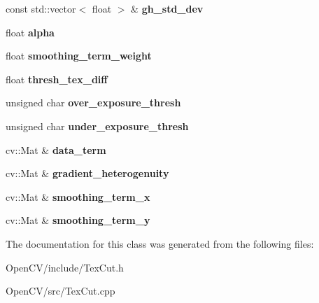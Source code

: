 \begin{DoxyCompactItemize}
\hypertarget{classskl_1_1_parallel_calc_edge_capacity_a0e4d4be48637b8329afced2078b24081}{}\label{classskl_1_1_parallel_calc_edge_capacity_a0e4d4be48637b8329afced2078b24081} 
const std\+::vector$<$ float $>$ \& {\bfseries gh\+\_\+std\+\_\+dev}
\item 
\hypertarget{classskl_1_1_parallel_calc_edge_capacity_a8c1357b077c4e24cac27dbfc1ab37c5f}{}\label{classskl_1_1_parallel_calc_edge_capacity_a8c1357b077c4e24cac27dbfc1ab37c5f} 
float {\bfseries alpha}
\item 
\hypertarget{classskl_1_1_parallel_calc_edge_capacity_a3f8029fdb418938063f265e7aba12795}{}\label{classskl_1_1_parallel_calc_edge_capacity_a3f8029fdb418938063f265e7aba12795} 
float {\bfseries smoothing\+\_\+term\+\_\+weight}
\item 
\hypertarget{classskl_1_1_parallel_calc_edge_capacity_a5aa3e138bcc496248b4fd1856ebdf750}{}\label{classskl_1_1_parallel_calc_edge_capacity_a5aa3e138bcc496248b4fd1856ebdf750} 
float {\bfseries thresh\+\_\+tex\+\_\+diff}
\item 
\hypertarget{classskl_1_1_parallel_calc_edge_capacity_adaa007555ae37355864ef92d75da1e5d}{}\label{classskl_1_1_parallel_calc_edge_capacity_adaa007555ae37355864ef92d75da1e5d} 
unsigned char {\bfseries over\+\_\+exposure\+\_\+thresh}
\item 
\hypertarget{classskl_1_1_parallel_calc_edge_capacity_a9bb9b4b9f637f66864556e2572c17c80}{}\label{classskl_1_1_parallel_calc_edge_capacity_a9bb9b4b9f637f66864556e2572c17c80} 
unsigned char {\bfseries under\+\_\+exposure\+\_\+thresh}
\item 
\hypertarget{classskl_1_1_parallel_calc_edge_capacity_ad0cc5000beb4722c91a9a18bdef20e0a}{}\label{classskl_1_1_parallel_calc_edge_capacity_ad0cc5000beb4722c91a9a18bdef20e0a} 
cv\+::\+Mat \& {\bfseries data\+\_\+term}
\item 
\hypertarget{classskl_1_1_parallel_calc_edge_capacity_ab80921f09bc3ac0d45b32cd5e5fe92ba}{}\label{classskl_1_1_parallel_calc_edge_capacity_ab80921f09bc3ac0d45b32cd5e5fe92ba} 
cv\+::\+Mat \& {\bfseries gradient\+\_\+heterogenuity}
\item 
\hypertarget{classskl_1_1_parallel_calc_edge_capacity_ab151367254689104f5e8977c4a6673c8}{}\label{classskl_1_1_parallel_calc_edge_capacity_ab151367254689104f5e8977c4a6673c8} 
cv\+::\+Mat \& {\bfseries smoothing\+\_\+term\+\_\+x}
\item 
\hypertarget{classskl_1_1_parallel_calc_edge_capacity_a4c2d2846717def8bd5df1310118c823c}{}\label{classskl_1_1_parallel_calc_edge_capacity_a4c2d2846717def8bd5df1310118c823c} 
cv\+::\+Mat \& {\bfseries smoothing\+\_\+term\+\_\+y}
\end{DoxyCompactItemize}


The documentation for this class was generated from the following files\+:\begin{DoxyCompactItemize}
\item 
Open\+C\+V/include/Tex\+Cut.\+h\item 
Open\+C\+V/src/Tex\+Cut.\+cpp\end{DoxyCompactItemize}
